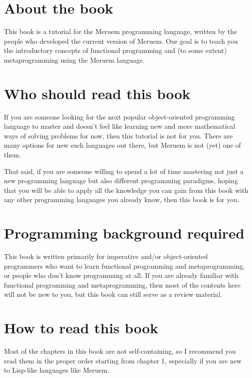 \section{About the book}
This book is a tutorial for the Meruem programming language, written by the people who developed the current version of Meruem. Our goal is to teach you the introductory concepts of functional programming and (to some extent) metaprogramming using the Meruem language. 

\section{Who should read this book}
If you are someone looking for the next popular object-oriented programming language to master and doesn't feel like learning new and more mathematical ways of solving problems for now, then this tutorial is not for you. There are many options for new such languages out there, but Meruem is not (yet) one of them.

That said, if you are someone willing to spend a lot of time mastering not just a new programming language but also different programming paradigms, hoping that you will be able to apply all the knowledge you can gain from this book with any other programming languages you already know, then this book is for you.

\section{Programming background required}
This book is written primarily for imperative and/or object-oriented programmers who want to learn functional programming and metaprogramming, or people who don't know programming at all. If you are already familiar with functional programming and metaprogramming, then most of the contents here will not be new to you, but this book can still serve as a review material.

\section{How to read this book}
Most of the chapters in this book are not self-containing, so I recommend you read them in the proper order starting from chapter 1, especially if you are new to Lisp-like languages like Meruem. 